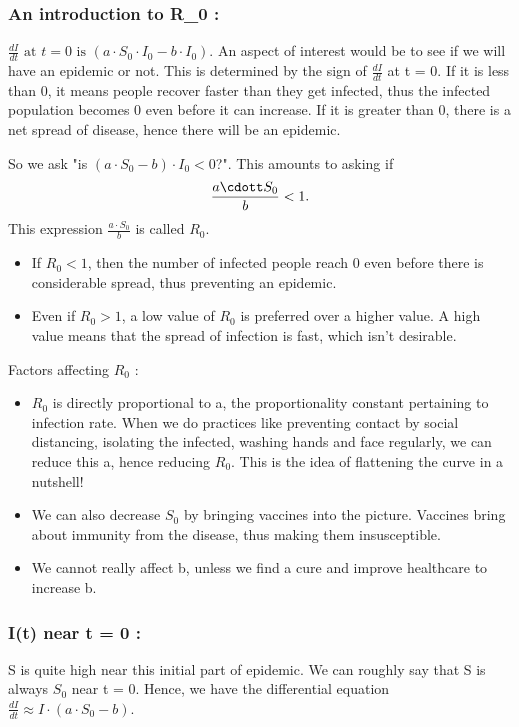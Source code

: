 \documentclass{article}
\begin{document}
\subsubsection*{An introduction to R_0 :}
$\frac{dI}{dt} \textrm{ at } t = 0 \textrm{ is } (a\cdot S_0 \cdot I_0 -b \cdot I_0) $. 
An aspect of interest would be to see if we will have an epidemic or not. This is determined by the sign of $\frac{dI}{dt} $ at t = 0. If it is less than 0, it means people recover faster than they get infected, thus the infected population becomes 0 even before it can increase. If it is greater than 0, there is a net spread of disease, hence there will be an epidemic.

So we ask "is $(a\cdot S_0 - b)\cdot I_0 < 0$?". This amounts to asking if $$\frac{a \cdott S_0}{b} < 1.$$ This expression $\frac{a\cdot S_0}{b}$ is called $R_0$. 
\begin{itemize}
    \item If $R_0 < 1$, then the number of infected people reach 0 even before there is considerable spread, thus preventing an epidemic.
    \item Even if $R_0 > 1$, a low value of $R_0$ is preferred over a higher value. A high value means that the spread of infection is fast, which isn't desirable.
\end{itemize}
Factors affecting $R_0$ : 
\begin{itemize}
    \item $R_0$ is directly proportional to a, the proportionality constant pertaining to infection rate. When we do practices like preventing contact by social distancing, isolating the infected, washing hands and face regularly, we can reduce this a, hence reducing $R_0$. This is the idea of flattening the curve in a nutshell!
    \item We can also decrease $S_0$ by bringing vaccines into the picture. Vaccines bring about immunity from the disease, thus making them insusceptible.
    \item We cannot really affect b, unless we find a cure and improve healthcare to increase b.
\end{itemize}
\subsubsection*{I(t) near t = 0 :}
S is quite high near this initial part of epidemic. We can roughly say that S is always $S_0$ near t = 0.
Hence, we have the differential equation $\frac{dI}{dt} \approx I\cdot(a\cdot S_0 - b)$. 
\end{document}
